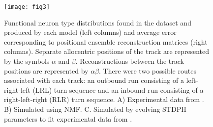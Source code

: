 \begin{figure}[ht]
	\centering
	\texttt{[image: fig3]}
    \caption{Functional neuron type distributions found in the dataset and produced by each model (left columns) and average error corresponding to positional ensemble reconstruction matrices (right columns). Separate allocentric positions of the track are represented by the symbols $\alpha$ and $\beta$. Reconstructions between the track positions are represented by $\alpha$$\beta$. There were two possible routes associated with each track: an outbound run consisting of a left-right-left (LRL) turn sequence and an inbound run consisting of a right-left-right (RLR) turn sequence. A) Experimental data from \cite{AlexanderNitz2015}. B) Simulated using NMF. C. Simulated by evolving STDPH parameters to fit experimental data from \cite{Rounds2016}.}
	\label{fig:NMF|RSC}
\end{figure} 





